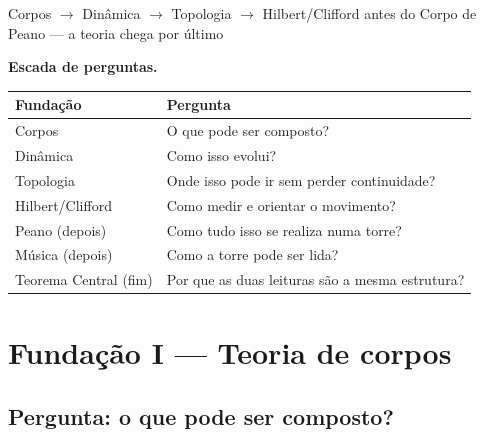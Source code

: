 \documentclass[11pt,a4paper]{article}
\newcommand{\code}[1]{\texttt{\small #1}}
\begin{document}
       {Corpos $\to$ Dinâmica $\to$ Topologia $\to$ Hilbert/Clifford}
       {antes do Corpo de Peano --- a teoria chega por último}
\maketitle

\begin{abstract}
\noindent Não se constrói um prédio pelo teto. Este documento é a
\textbf{torre abaixo}: quatro fundações, cada uma a responder a uma
pergunta que a torre precisa resolver. Só depois se entra no
\emph{Corpo de Peano} (\code{papers/corpo\_peano.tex}), no Teorema
Central Gentil\,$\leftrightarrow$\,Hurwitz, na música e na histerese.
\[
\boxed{
\text{Corpos}
\;\to\;
\text{Dinâmica}
\;\to\;
\text{Topologia}
\;\to\;
\text{Hilbert/Clifford}
\;\to\;
\text{Corpo de Peano}
\;\to\;
\text{Teorema Central}.
}
\]
Não é um capítulo universitário genérico: é a escada até a
arquitectura aparecer como consequência.
\end{abstract}

\medskip
\noindent\textbf{Escada de perguntas.}
\begin{center}\small
\begin{tabular}{@{}lp{8.6cm}@{}}
\toprule
Fundação & Pergunta \\
\midrule
Corpos & O que pode ser composto? \\
Dinâmica & Como isso evolui? \\
Topologia & Onde isso pode ir sem perder continuidade? \\
Hilbert/Clifford & Como medir e orientar o movimento? \\
Peano (depois) & Como tudo isso se realiza numa torre? \\
Música (depois) & Como a torre pode ser lida? \\
Teorema Central (fim) & Por que as duas leituras são a mesma estrutura? \\
\bottomrule
\end{tabular}
\end{center}

\section{Fundação I --- Teoria de corpos}\label{sec:fund-corpos}
\subsection*{Pergunta: o que pode ser composto?}
\end{document}
